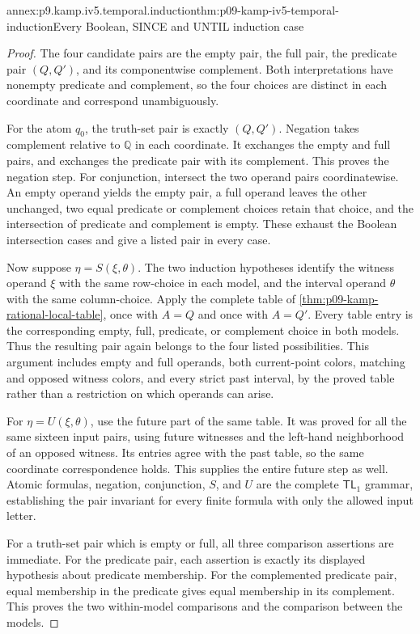 \begin{annexitem}{annex:p9.kamp.iv5.temporal.induction}{thm:p09-kamp-iv5-temporal-induction}{Every Boolean, SINCE and UNTIL induction case}
\begin{proof}
The four candidate pairs are the empty pair, the full
pair, the predicate pair \((Q,Q')\), and its componentwise
complement. Both interpretations have nonempty predicate
and complement, so the four choices are distinct in
each coordinate and correspond unambiguously.

For the atom \(q_0\), the truth-set pair is exactly
\((Q,Q')\). Negation takes complement relative to
\(\mathbb Q\) in each coordinate. It exchanges
the empty and full pairs, and exchanges the predicate
pair with its complement. This proves the negation step.
For conjunction, intersect the two operand pairs
coordinatewise. An empty operand yields the empty pair,
a full operand leaves the other unchanged, two equal
predicate or complement choices retain that choice,
and the intersection of predicate and complement is
empty. These exhaust the Boolean intersection cases
and give a listed pair in every case.

Now suppose \(\eta=S(\xi,\theta)\). The two
induction hypotheses identify the witness operand
\(\xi\) with the same row-choice in each model,
and the interval operand \(\theta\) with the same
column-choice. Apply the complete table of
\cref{thm:p09-kamp-rational-local-table}, once with
\(A=Q\) and once with \(A=Q'\). Every table entry
is the corresponding empty, full, predicate, or
complement choice in both models. Thus the resulting
pair again belongs to the four listed possibilities.
This argument includes empty and full operands, both
current-point colors, matching and opposed witness
colors, and every strict past interval, by the proved
table rather than a restriction on which operands
can arise.

For \(\eta=U(\xi,\theta)\), use the future part
of the same table. It was proved for all the same
sixteen input pairs, using future witnesses and the
left-hand neighborhood of an opposed witness. Its
entries agree with the past table, so the same
coordinate correspondence holds. This supplies the
entire future step as well. Atomic formulas,
negation, conjunction, \(S\), and \(U\) are the
complete \(\mathsf{TL}_1\) grammar, establishing
the pair invariant for every finite formula with
only the allowed input letter.

For a truth-set pair which is empty or full, all
three comparison assertions are immediate. For the
predicate pair, each assertion is exactly its
displayed hypothesis about predicate membership.
For the complemented predicate pair, equal membership
in the predicate gives equal membership in its
complement. This proves the two within-model
comparisons and the comparison between the models.


\end{proof}
\end{annexitem}
